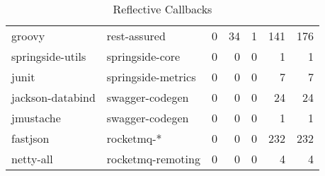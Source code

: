 \begin{table}[ht]
\begin{tabular}{llrrrrr}
  groovy & rest-assured & 0 & 34 & 1 & 141 & 176 \\ 
  springside-utils & springside-core & 0 & 0 & 0 & 1 & 1 \\ 
  junit & springside-metrics & 0 & 0 & 0 & 7 & 7 \\ 
  jackson-databind & swagger-codegen & 0 & 0 & 0 & 24 & 24 \\ 
  jmustache & swagger-codegen & 0 & 0 & 0 & 1 & 1 \\ 
  fastjson & rocketmq-* & 0 & 0 & 0 & 232 & 232 \\ 
  netty-all & rocketmq-remoting & 0 & 0 & 0 & 4 & 4 \\ 
   \hline
\end{tabular}
\endgroup
\caption{\label{tab:refl-callbacks}Reflective Callbacks} 
\end{table}
